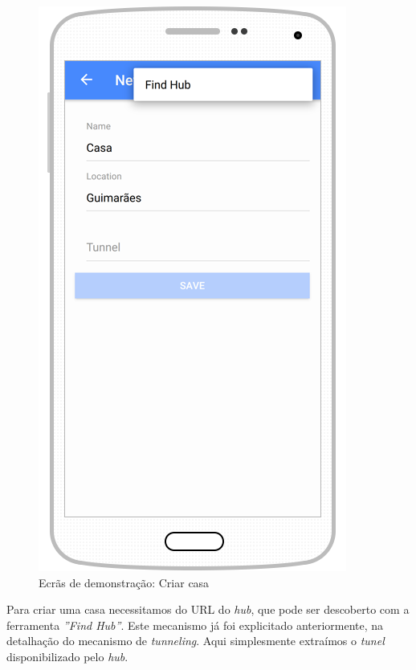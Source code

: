 \begin{figure}[H]
  \centering
        \includegraphics[scale=0.6]{img/demo/create_home.png}
  \caption{Ecrãs de demonstração: Criar casa}
\end{figure}

Para criar uma casa necessitamos do URL do \textit{hub}, que pode ser descoberto com a ferramenta \textit{''Find Hub''}. Este mecanismo já foi explicitado anteriormente, na detalhação do mecanismo de \textit{tunneling}. Aqui simplesmente extraímos o \textit{tunel} disponibilizado pelo \textit{hub}.

